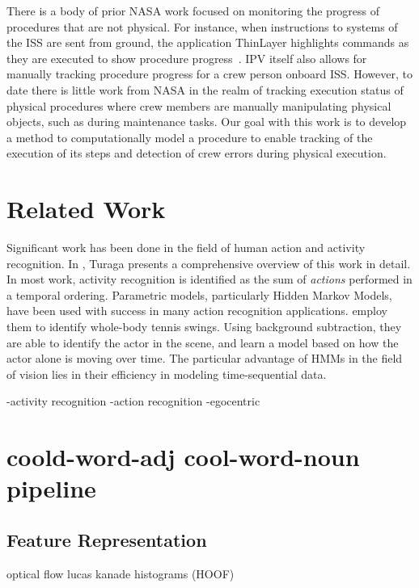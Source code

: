 \documentclass[10pt,twocolumn,letterpaper]{article}
\begin{document}
There is a body of prior NASA work focused on monitoring the progress of procedures that are not physical. For instance, when instructions to systems of the ISS are sent from ground, the application ThinLayer highlights commands as they are executed to show procedure progress~\cite{frank2010plans}. IPV itself also allows for manually tracking procedure progress for a crew person onboard ISS. However, to date there is little work from NASA in the realm of tracking execution status of physical procedures where crew members are manually manipulating physical objects, such as during maintenance tasks. Our goal with this work is to develop a method to computationally model a procedure to enable tracking of the execution of its steps and detection of crew errors during physical execution.


\section{Related Work}

Significant work has been done in the field of human action and activity recognition. In \cite{turaga2008machine}, Turaga presents a comprehensive overview of this work in detail. In most work, activity recognition is identified as the sum of \emph{actions} performed in a temporal ordering. Parametric models, particularly Hidden Markov Models, have been used with success in many action recognition applications. \cite{yamato1992recognizing} employ them to identify whole-body tennis swings. Using background subtraction, they are able to identify the actor in the scene, and learn a model based on how the actor alone is moving over time. The particular advantage of HMMs in the field of vision lies in their efficiency in modeling time-sequential data.



-activity recognition
-action recognition
-egocentric

\section{coold-word-adj cool-word-noun pipeline}


\subsection{Feature Representation}
optical flow lucas kanade
histograms (HOOF)
\end{document}
